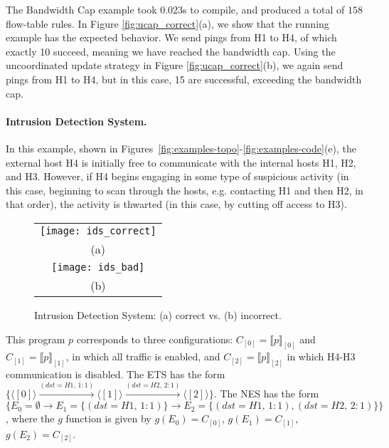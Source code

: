 \documentclass[pldi-cameraready]{sigplanconf}
\begin{document}
The Bandwidth Cap example took $0.023$s to compile, and produced a total of $158$ flow-table rules.
In Figure \ref{fig:ucap_correct}(a), we show that the running example has
the expected behavior. We send pings from H1 to H4, of which exactly 10 succeed, meaning we have
reached the bandwidth cap.
Using the uncoordinated update strategy in Figure \ref{fig:ucap_correct}(b), we again send pings
from H1 to H4, but in this case, 15 are successful, exceeding the bandwidth cap.

\paragraph{Intrusion Detection System.} In this example, shown in Figures~\ref{fig:examples-topo}-\ref{fig:examples-code}(e),
the external host H4 is initially free to communicate with the internal hosts H1, H2, and H3.
However, if H4 begins engaging in some type of suspicious activity (in this case,
beginning to scan through the hosts, e.g. contacting H1 and then H2, in that order),
the activity is thwarted (in this case, by cutting off access to H3).

\begin{figure}
\centering
\bgroup
\def\arraystretch{0.5}
\begin{tabular}{c}
\texttt{[image: ids\_correct]} \\
{\scriptsize (a)} \\
\texttt{[image: ids\_bad]} \\
{\scriptsize (b)}
\end{tabular}
\egroup
\caption{Intrusion Detection System: (a) correct vs. (b) incorrect.}
\label{fig:ids_correct}
\end{figure}

This program $p$ corresponds to three configurations:
$C_{[0]} = \llbracket{p}\rrbracket_{[0]}$ and
$C_{[1]} = \llbracket{p}\rrbracket_{[1]}$, in which all traffic is enabled,
and $C_{[2]} = \llbracket{p}\rrbracket_{[2]}$ in which H4-H3 communication is disabled.
The ETS has the form $\{\langle [0] \rangle \xrightarrow{(dst{=}H1,\,{1{:}1})} \langle [1] \rangle \xrightarrow{(dst{=}H2,\,{2{:}1})} \langle [2] \rangle\}$.
The NES has the form $\{E_0{=}\emptyset \rightarrow E_1{=}\{(dst{=}H1,\,{1{:}1})\} \rightarrow E_2{=}\{(dst{=}H1,\,{1{:}1}),(dst{=}H2,\,\allowbreak{2{:}1})\}\}$,
where the $g$ function is given by $g(E_0)=C_{[0]}$, $g(E_1)=C_{[1]}$, $g(E_2)=C_{[2]}$.
\end{document}
